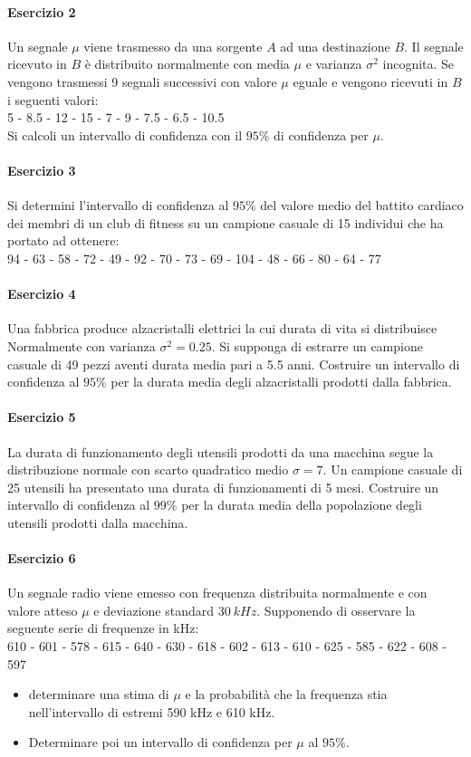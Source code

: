 \documentclass[12pt]{article}
\begin{document}
    \paragraph{Esercizio 2}
    Un segnale $\mu$ viene trasmesso da una sorgente $A$ ad una destinazione $B$. Il segnale ricevuto in $B$ è distribuito normalmente con media $\mu$ e varianza $\sigma^2$ incognita. Se vengono trasmessi 9 segnali successivi con valore $\mu$ eguale e vengono ricevuti in $B$ i seguenti valori: 
    \\5 - 8.5 - 12 - 15 - 7 - 9 - 7.5 - 6.5 - 10.5
    \\Si calcoli un intervallo di confidenza con il $95\%$ di confidenza per $\mu$.
    \paragraph{Esercizio 3}
    Si determini l’intervallo di confidenza al $95\%$ del valore medio del battito cardiaco dei membri di un club di fitness su un campione casuale di 15 individui che ha portato ad ottenere:
    \\94 - 63 - 58 - 72 - 49 - 92 - 70 - 73 - 69 - 104 - 48 - 66 - 80 - 64 - 77
    \paragraph{Esercizio 4}
    Una fabbrica produce alzacristalli elettrici la cui durata di vita si distribuisce Normalmente con varianza $\sigma^2=0.25$. Si supponga di estrarre un campione casuale di 49 pezzi aventi durata media pari a 5.5 anni. Costruire un intervallo di confidenza al $95\%$ per la durata media degli alzacristalli prodotti dalla fabbrica.
    \paragraph{Esercizio 5}
    La durata di funzionamento degli utensili prodotti da una macchina segue la distribuzione normale con scarto quadratico medio $\sigma=7$. Un campione casuale di 25 utensili ha presentato una durata di funzionamenti di 5 mesi. Costruire un intervallo di confidenza al $99\%$ per la durata media della popolazione degli utensili prodotti dalla macchina.
    \newpage
    \paragraph{Esercizio 6}
    Un segnale radio viene emesso con frequenza distribuita normalmente e con valore atteso $\mu$ e deviazione standard $30 \ kHz$. Supponendo di osservare la seguente serie di frequenze in kHz:
    \\610 - 601 - 578 - 615 - 640 - 630 - 618 - 602 - 613 - 610 - 625 - 585 - 622 - 608 - 597
    \begin{itemize}
        \item determinare una stima di $\mu$ e la probabilità che la frequenza stia nell’intervallo di estremi 590 kHz e 610 kHz.
        \item Determinare poi un intervallo di confidenza per $\mu$ al $95\%$. 
    \end{itemize}
\end{document}

